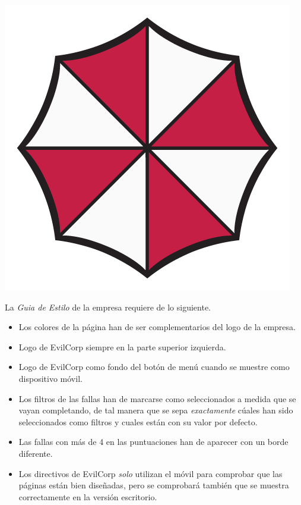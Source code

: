 \documentclass[a4paper,10pt]{article}
\begin{document}
\includegraphics[width=\textwidth]{imgs/evilcorp}

La \textit{Guia de Estilo} de la empresa requiere de lo siguiente.

\begin{itemize}

\item Los colores de la página han de ser complementarios del logo de la empresa.
\item Logo de EvilCorp siempre en la parte superior izquierda.
\item Logo de EvilCorp como fondo del botón de menú cuando se muestre como dispositivo móvil.
\item Los filtros de las fallas han de marcarse como seleccionados a medida que se vayan completando, de tal manera que se sepa \textit{exactamente} cúales han sido seleccionados como filtros y cuales están con su valor por defecto.
\item Las fallas con más de 4 en las puntuaciones han de aparecer con un borde diferente.
\item Los directivos de EvilCorp \textit{solo} utilizan el móvil para comprobar que las páginas están bien diseñadas, pero se comprobará también que se muestra correctamente en la versión escritorio.
  
\end{itemize}
\end{document}
